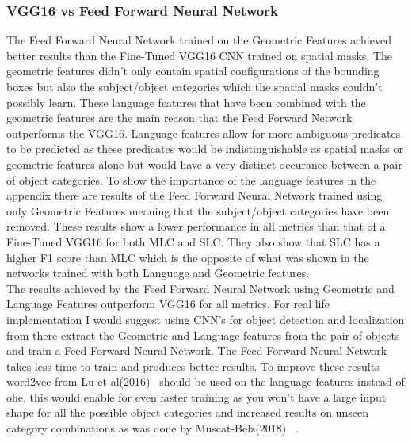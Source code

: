 \documentclass{csfyp}
\newcommand\tab[1][1cm]{\hspace*{#1}}
\begin{document}
\subsubsection{VGG16 vs Feed Forward Neural Network}
The Feed Forward Neural Network trained on the Geometric Features achieved better results than the Fine-Tuned VGG16 CNN trained on spatial masks. The geometric features didn't only contain spatial configurations of the bounding boxes but also the subject/object categories which the spatial masks couldn't possibly learn. These language features that have been combined with the geometric features are the main reason that the Feed Forward Network outperforms the VGG16. Language features allow for more ambiguous \Gls{predicate}s to be predicted as these \Gls{predicate}s would be indistinguishable as spatial masks or geometric features alone but would have a very distinct occurance between a pair of object categories. To show the importance of the language features in the appendix there are results of the Feed Forward Neural Network trained using only Geometric Features meaning that the subject/object categories have been removed. These results show a lower performance in all metrics than that of a Fine-Tuned VGG16 for both MLC and SLC. They also show that SLC has a higher F1 score than MLC which is the opposite of what was shown in the networks trained with both Language and Geometric features.
\\
\tab The results achieved by the Feed Forward Neural Network using Geometric and Language Features outperform VGG16 for all metrics. For real life implementation I would suggest using CNN's for object detection and localization from there extract the Geometric and Language features from the pair of objects and train a Feed Forward Neural Network. The Feed Forward Neural Network takes less time to train and produces better results. To improve these results word2vec from Lu et al(2016)~\cite{lu2016visual} should be used on the language features instead of \Gls{ohe}, this would enable for even faster training as you won't have a large input shape for all the possible object categories and increased results on unseen category combinations as was done by Muscat-Belz(2018)~\cite{belz-etal-2018-spatialvoc2k} .
\end{document}

